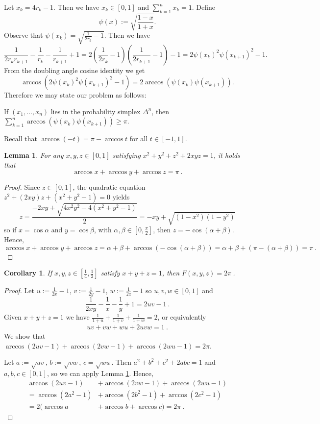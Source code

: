 \documentclass[reqno,hidelinks,11pt]{amsart}
\numberwithin{equation}{section}
\newtheorem{lemma}[theorem]{Lemma}
\newtheorem{corollary}[theorem]{Corollary}
\begin{document}
Let $x_k=4r_k-1$. Then we have $x_k\in [0,1]$ and $\sum_{k=1}^n x_k=1$. Define $$\psi(x):=\sqrt{\frac{1-x}{1+x}}.$$
Observe that $\psi(x_k)=\sqrt{\frac{1}{2r_k}-1}$.
Then we have
\[\frac{1}{2r_kr_{k+1}}-\frac{1}{r_k}-\frac{1}{r_{k+1}}+1=2\left(\frac{1}{2r_k}-1\right)\left(\frac{1}{2r_{k+1}}-1 \right)-1=2\psi(x_k)^2\psi(x_{k+1})^2-1.\]
From the doubling angle cosine identity we get \[\arccos \left(2\psi(x_k)^2\psi(x_{k+1})^2-1\right)=2\arccos \left(\psi(x_k)\psi(x_{k+1})\right)  .\]
Therefore we may state our problem as follows:

\begin{center}
    If $(x_1,\dots,x_n)$ lies in the probability simplex $\Delta^n$, then $\sum_{k=1}^n\arccos(\psi(x_k)\psi(x_{k+1}))\geq\pi$.
\end{center}

Recall that $\arccos(-t)=\pi-\arccos t$ for all $t\in[-1,1]$. 
\begin{lemma}\label{lemma: identity}
    For any $x,y,z\in[0,1]$ satisfying $x^2+y^2+z^2+2xyz=1$, it holds that
    \[
    \arccos x+\arccos y+\arccos z=\pi~.
    \]
\end{lemma}
\begin{proof}
    Since $z\in[0,1]$, the quadratic equation $z^2+(2xy)z+(x^2+y^2-1)=0$ yields 
    \[
    z=\frac{-2xy+\sqrt{4x^2y^2-4(x^2+y^2-1)}}2=-xy+\sqrt{(1-x^2)(1-y^2)}
    \]
    so if $x=\cos\alpha$ and $y=\cos\beta$, with $\alpha,\beta\in[0,\frac{\pi}2]$, then $z=-\cos(\alpha+\beta)$. Hence,
    \[
        \arccos x+\arccos y+\arccos z=\alpha+\beta+\arccos(-\cos(\alpha+\beta))=\alpha+\beta+(\pi-(\alpha+\beta))=\pi~.
    \]
\end{proof}
\begin{corollary}\label{cor: arcos n=3}
    If $x,y,z\in[\frac14,\frac12]$ satisfy $x+y+z=1$, then $F(x,y,z)=2\pi~$.
\end{corollary}
\begin{proof}
Let $u:=\frac1{2x}-1$, $v:=\frac1{2y}-1$, $w:=\frac1{2z}-1$ so $u,v,w\in[0,1]$ and
\[
\frac1{2xy}-\frac1x-\frac1y+1=2uv-1~.
\]
Given $x+y+z=1$ we have $\frac1{1+u}+\frac1{1+v}+\frac1{1+w}=2$, or equivalently
\begin{align*}
    uv+vw+wu+2uvw=1~.
\end{align*}
We show that $\arccos(2uv-1)+\arccos(2vw-1)+\arccos(2wu-1)=2\pi$.

Let $a:=\sqrt{uv}$, $b:=\sqrt{vw}$, $c=\sqrt{wu}$. Then $a^2+b^2+c^2+2abc=1$ and $a,b,c\in[0,1]$, so we can apply Lemma \ref{lemma: identity}. Hence,
\begin{align*}
     \arccos(2uv-1)&+\arccos(2vw-1)+\arccos(2wu-1)\\
     = \arccos(2a^2-1)&+\arccos(2b^2-1)+\arccos(2c^2-1)\\
     =2(\arccos a&+\arccos b+\arccos c)=2\pi~.
\end{align*}
\end{proof}
\end{document}
